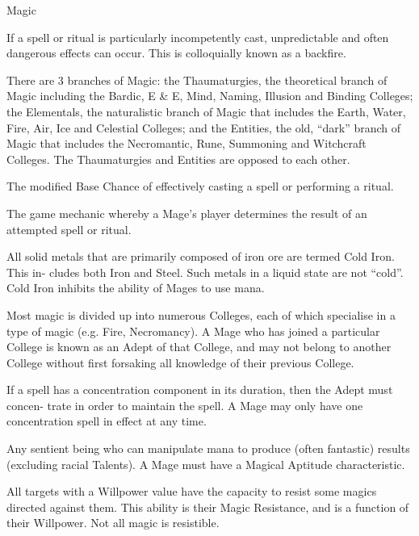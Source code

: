 \begin{Chapter}{Magic}
\begin{Description}
\item[Backfire] If a spell or ritual is particularly incompetently
  cast, unpredictable and often dangerous effects can occur.  This is
  colloquially known as a backfire.

\item[Branches of Magic] There are 3 branches of Magic: the
  Thaumaturgies, the theoretical branch of Magic including the Bardic,
  E \& E, Mind, Naming, Illusion and Binding Colleges; the Elementals,
  the naturalistic branch of Magic that includes the Earth, Water,
  Fire, Air, Ice and Celestial Colleges; and the Entities, the old,
  “dark” branch of Magic that includes the Necromantic, Rune,
  Summoning and Witchcraft Colleges.  The Thaumaturgies and Entities
  are opposed to each other.

\item[Cast Chance] The modified Base Chance of effectively casting a
  spell or performing a ritual.

\item[Cast Check] The game mechanic whereby a Mage’s player determines
  the result of an attempted spell or ritual.

\item[Cold Iron] All solid metals that are primarily composed of iron
  ore are termed Cold Iron.  This in- cludes both Iron and Steel. Such
  metals in a liquid state are not “cold”. Cold Iron inhibits the
  ability of Mages to use mana.

\item[College ] Most magic is divided up into numerous Colleges, each
  of which specialise in a type of magic (e.g.  Fire, Necromancy).  A
  Mage who has joined a particular College is known as an Adept of
  that College, and may not belong to another College without first
  forsaking all knowledge of their previous College.

\item[Concentration] If a spell has a concentration component in its
  duration, then the Adept must concen- trate in order to maintain the
  spell.  A Mage may only have one concentration spell in effect at
  any time.

\item[Mage] Any sentient being who can manipulate mana to produce
  (often fantastic) results (excluding racial Talents). A Mage must
  have a Magical Aptitude characteristic.

\item[Magic Resistance] All targets with a Willpower value have the
  capacity to resist some magics directed against them.  This ability
  is their Magic Resistance, and is a function of their Willpower.
  Not all magic is resistible.


\end{Description}
\end{Chapter}

